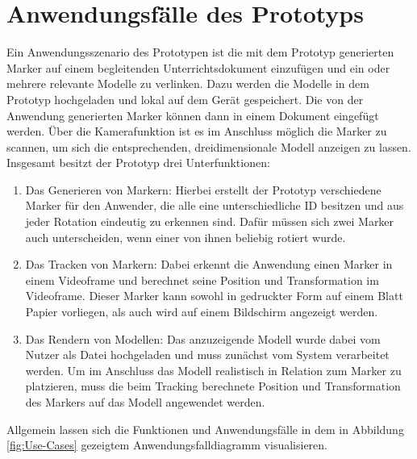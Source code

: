 \section{Anwendungsfälle des Prototyps}
Ein Anwendungsszenario des Prototypen ist die mit dem Prototyp generierten Marker auf einem begleitenden Unterrichtsdokument einzufügen und ein oder mehrere relevante Modelle zu verlinken. Dazu werden die Modelle in dem Prototyp hochgeladen und lokal auf dem Gerät gespeichert. Die von der Anwendung generierten Marker können dann in einem Dokument eingefügt werden. Über die Kamerafunktion ist es im Anschluss möglich die Marker zu scannen, um sich die entsprechenden, dreidimensionale Modell anzeigen zu lassen.\\
Insgesamt besitzt der Prototyp drei Unterfunktionen: 
\begin{enumerate}
\item Das Generieren von Markern: Hierbei erstellt der Prototyp verschiedene Marker für den Anwender, die alle eine unterschiedliche ID besitzen und aus jeder Rotation eindeutig zu erkennen sind. Dafür müssen sich zwei Marker auch unterscheiden, wenn einer von ihnen beliebig rotiert wurde.
\item Das Tracken von Markern: Dabei erkennt die Anwendung einen Marker in einem Videoframe und berechnet seine Position und Transformation im Videoframe. Dieser Marker kann sowohl in gedruckter Form auf einem Blatt Papier vorliegen, als auch wird auf einem Bildschirm angezeigt werden.
\item Das Rendern von Modellen: Das anzuzeigende Modell wurde dabei vom Nutzer  als Datei hochgeladen und muss zunächst vom System verarbeitet werden. Um im Anschluss das Modell realistisch in Relation zum Marker zu platzieren, muss die beim Tracking berechnete Position und Transformation des Markers auf das Modell angewendet werden. 
\end{enumerate} 
Allgemein lassen sich die Funktionen und Anwendungsfälle in dem in Abbildung \ref{fig:Use-Cases} gezeigtem Anwendungsfalldiagramm visualisieren.
